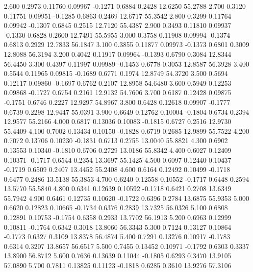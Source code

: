    2.600   0.2973   0.11760   0.09967  -0.1271   0.6884   0.2428  12.6250  55.2788
   2.700   0.3120   0.11751   0.09951  -0.1285   0.6863   0.2469  12.6717  55.3542
   2.800   0.3299   0.11764   0.09942  -0.1307   0.6845   0.2515  12.7120  55.4387
   2.900   0.3493   0.11810   0.09937  -0.1330   0.6828   0.2600  12.7491  55.5955
   3.000   0.3758   0.11908   0.09994  -0.1374   0.6813   0.2929  12.7833  56.1847
   3.100   0.3855   0.11877   0.09973  -0.1373   0.6801   0.3009  12.8088  56.3194
   3.200   0.4042   0.11917   0.09964  -0.1393   0.6790   0.3084  12.8344  56.4450
   3.300   0.4397   0.11997   0.09989  -0.1453   0.6778   0.3053  12.8587  56.3928
   3.400   0.5544   0.11965   0.09815  -0.1689   0.6771   0.1974  12.8749  54.3720
   3.500   0.5694   0.12117   0.09860  -0.1697   0.6762   0.2107  12.8958  54.6480
   3.600   0.5949   0.12253   0.09868  -0.1727   0.6754   0.2161  12.9132  54.7606
   3.700   0.6187   0.12428   0.09875  -0.1751   0.6746   0.2227  12.9297  54.8967
   3.800   0.6428   0.12618   0.09907  -0.1777   0.6739   0.2298  12.9447  55.0391
   3.900   0.6649   0.12762   0.10004  -0.1804   0.6734   0.2394  12.9577  55.2166
   4.000   0.6817   0.13036   0.10083  -0.1815   0.6727   0.2516  12.9730  55.4409
   4.100   0.7002   0.13434   0.10150  -0.1828   0.6719   0.2685  12.9899  55.7522
   4.200   0.7072   0.13706   0.10230  -0.1831   0.6713   0.2755  13.0040  55.8821
   4.300   0.6902   0.13553   0.10340  -0.1810   0.6706   0.2729  13.0186  55.8342
   4.400   0.6027   0.12409   0.10371  -0.1717   0.6544   0.2354  13.3697  55.1425
   4.500   0.6097   0.12440   0.10437  -0.1719   0.6509   0.2407  13.4452  55.2408
   4.600   0.6164   0.12492   0.10499  -0.1718   0.6477   0.2486  13.5138  55.3853
   4.700   0.6240   0.12558   0.10552  -0.1717   0.6448   0.2594  13.5770  55.5840
   4.800   0.6341   0.12639   0.10592  -0.1718   0.6421   0.2708  13.6349  55.7942
   4.900   0.6461   0.12735   0.10620  -0.1722   0.6396   0.2784  13.6875  55.9353
   5.000   0.6620   0.12823   0.10665  -0.1734   0.6376   0.2839  13.7325  56.0326
   5.100   0.6808   0.12891   0.10753  -0.1754   0.6358   0.2933  13.7702  56.1913
   5.200   0.6963   0.12999   0.10811  -0.1764   0.6342   0.3018  13.8060  56.3343
   5.300   0.7124   0.13127   0.10864  -0.1773   0.6327   0.3109  13.8378  56.4874
   5.400   0.7291   0.13276   0.10917  -0.1783   0.6314   0.3207  13.8657  56.6517
   5.500   0.7455   0.13452   0.10971  -0.1792   0.6303   0.3337  13.8900  56.8712
   5.600   0.7636   0.13639   0.11044  -0.1805   0.6293   0.3470  13.9105  57.0890
   5.700   0.7811   0.13825   0.11123  -0.1818   0.6285   0.3610  13.9276  57.3106
